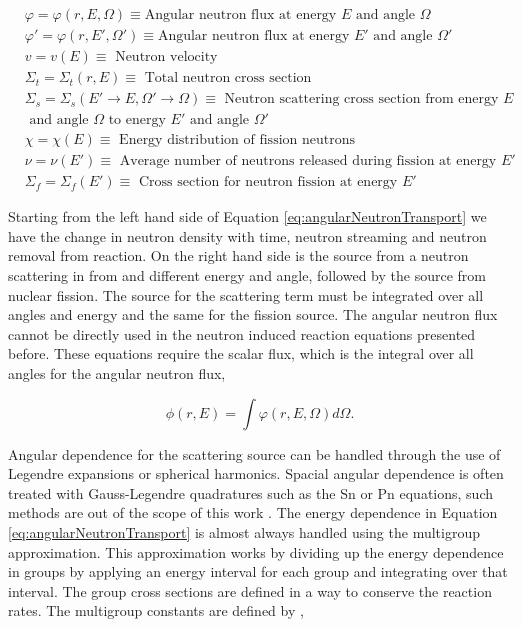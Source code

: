 $\begin{aligned}
&\varphi = \varphi(r, E, \Omega) \equiv   \text{Angular neutron flux at energy } E \text{ and angle } \Omega  \\
&\varphi' = \varphi(r, E', \Omega') \equiv   \text{Angular neutron flux at energy } E' \text{ and angle } \Omega'  \\
& v = v(E) \equiv \text{ Neutron velocity} \\
&\Sigma_{t} = \Sigma_{t}(r, E) \equiv \text{ Total neutron cross section} \\
&\Sigma_{s} = \Sigma_{s}(E' \rightarrow E,\Omega' \rightarrow \Omega) \equiv \text{ Neutron scattering cross section from energy } E \\
& \text{ and angle } \Omega \text{ to energy } E' \text{ and angle } \Omega' \\
&\chi = \chi(E) \equiv \text{ Energy distribution of fission neutrons} \\
&\nu = \nu(E') \equiv \text{ Average number of neutrons released during fission at energy } E' \\ 
&\Sigma_{f} = \Sigma_{f}(E') \equiv \text{ Cross section for neutron fission at energy } E' 
\end{aligned}$

\vspace{0.5cm}

\noindent Starting from the left hand side of Equation \ref{eq:angularNeutronTransport} we have the change in neutron density with time, neutron streaming and neutron removal from reaction. On the right hand side is the source from a neutron scattering in from and different energy and angle, followed by the source from nuclear fission. The source for the scattering term must be integrated over all angles and energy and the same for the fission source. The angular neutron flux cannot be directly used in the neutron induced reaction equations presented before. These equations require the scalar flux, which is the integral over all angles for the angular neutron flux,

\begin{equation}
    \phi(r,E) = \int \varphi(r,E,\Omega)d \Omega.
\end{equation}

Angular dependence for the scattering source can be handled through the use of Legendre expansions or spherical harmonics. Spacial angular dependence is often treated with Gauss-Legendre quadratures such as the Sn or Pn equations, such methods are out of the scope of this work \cite{millerCompTransport}. The energy dependence in Equation \ref{eq:angularNeutronTransport} is almost always handled using the multigroup approximation. This approximation works by dividing up the energy dependence in groups by applying an energy interval for each group and integrating over that interval. The group cross sections are defined in a way to conserve the reaction rates. The multigroup constants are defined by \cite{millerCompTransport} \cite{duderstadt1976},

